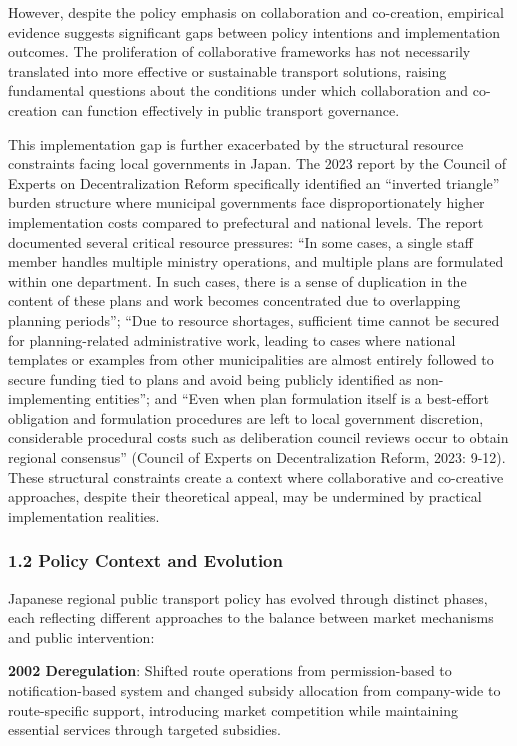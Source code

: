 However, despite the policy emphasis on collaboration and co-creation, empirical evidence suggests significant gaps between policy intentions and implementation outcomes. The proliferation of collaborative frameworks has not necessarily translated into more effective or sustainable transport solutions, raising fundamental questions about the conditions under which collaboration and co-creation can function effectively in public transport governance.

This implementation gap is further exacerbated by the structural resource constraints facing local governments in Japan. The 2023 report by the Council of Experts on Decentralization Reform specifically identified an ``inverted triangle'' burden structure where municipal governments face disproportionately higher implementation costs compared to prefectural and national levels. The report documented several critical resource pressures: ``In some cases, a single staff member handles multiple ministry operations, and multiple plans are formulated within one department. In such cases, there is a sense of duplication in the content of these plans and work becomes concentrated due to overlapping planning periods''; ``Due to resource shortages, sufficient time cannot be secured for planning-related administrative work, leading to cases where national templates or examples from other municipalities are almost entirely followed to secure funding tied to plans and avoid being publicly identified as non-implementing entities''; and ``Even when plan formulation itself is a best-effort obligation and formulation procedures are left to local government discretion, considerable procedural costs such as deliberation council reviews occur to obtain regional consensus'' (Council of Experts on Decentralization Reform, 2023: 9-12). These structural constraints create a context where collaborative and co-creative approaches, despite their theoretical appeal, may be undermined by practical implementation realities.

\subsubsection{1.2 Policy Context and Evolution}\label{policy-context-and-evolution}

Japanese regional public transport policy has evolved through distinct phases, each reflecting different approaches to the balance between market mechanisms and public intervention:

\textbf{2002 Deregulation}: Shifted route operations from permission-based to notification-based system and changed subsidy allocation from company-wide to route-specific support, introducing market competition while maintaining essential services through targeted subsidies.

